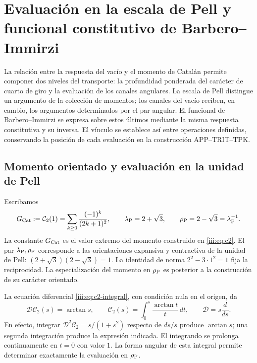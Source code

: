 \section{Evaluación en la escala de Pell y funcional constitutivo de Barbero--Immirzi}
\label{iii:sec:pell-barbero}

La relación entre la respuesta del vacío y el momento de Catalán permite
componer dos niveles del transporte: la profundidad ponderada del carácter
de cuarto de giro y la evaluación de los canales angulares. La escala de
Pell distingue un argumento de la colección de momentos; los canales del
vacío reciben, en cambio, los argumentos determinados por el par angular.
El funcional de Barbero--Immirzi se expresa sobre estos últimos mediante
la misma respuesta constitutiva y su inversa. El vínculo se establece así
entre operaciones definidas, conservando la posición de cada evaluación
en la construcción APP--TRIT--TPK.

\subsection{Momento orientado y evaluación en la unidad de Pell}

Escribamos
\begin{equation}
 G_{\rm Cat}:=\mathcal C_2(1)
 =\sum_{k\geq0}\frac{(-1)^k}{(2k+1)^2},\qquad
 \lambda_{\rm P}=2+\sqrt3,\qquad
 \rho_{\rm P}=2-\sqrt3=\lambda_{\rm P}^{-1}.
 \label{iii:eq:pell-scales}
\end{equation}
La constante $G_{\rm Cat}$ es el valor extremo del momento construido en
\eqref{iii:eq:c2}. El par $\lambda_{\rm P},\rho_{\rm P}$ corresponde a
las orientaciones expansiva y contractiva de la unidad de Pell:
$(2+\sqrt3)(2-\sqrt3)=1$. La identidad de norma $2^2-3\cdot1^2=1$
fija la reciprocidad. La especialización del momento en $\rho_{\rm P}$
es posterior a la construcción de su carácter orientado.

La ecuación diferencial \eqref{iii:eq:c2-integral}, con condición nula
en el origen, da
\begin{equation}
 \mathcal D\mathcal C_2(s)=\arctan s,\qquad
 \mathcal C_2(s)=\int_0^s\frac{\arctan t}{t}\,dt,
 \qquad \mathcal D=s\frac{d}{ds}.
 \label{iii:eq:pell-moment-integral}
\end{equation}
En efecto, integrar $\mathcal D^2\mathcal C_2=s/(1+s^2)$ respecto de
$ds/s$ produce $\arctan s$; una segunda integración produce la expresión
indicada. El integrando se prolonga continuamente en $t=0$ con valor $1$.
La forma angular de esta integral permite determinar exactamente la
evaluación en $\rho_{\rm P}$.

